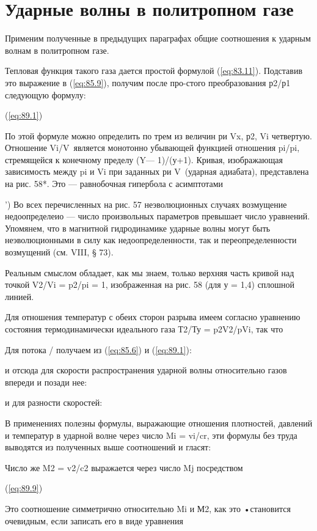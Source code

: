 \section{Ударные волны в политропном газе}\label{sec:p89}


Применим полученные в предыдущих параграфах общие соотношения к ударным волнам
в политропном газе.

Тепловая функция такого газа дается простой формулой (\ref{eq:83.11}). Подставив это
выражение в (\ref{eq:85.9}), получим после про-стого преобразования р2/р1 следующую
формулу:

(\ref{eq:89.1})

По этой формуле можно определить по трем из величин ри Vx, р2, Vi четвертую.
Отношение Vi/V\ является монотонно убывающей функцией отношения pi/pi,
стремящейся к конечному пределу (Y— 1)/(у+1). Кривая, изображающая зависимость
между pi и Vi при заданных ри V\ (ударная адиабата), представлена на рис. 58*.
Это — равнобочная гипербола с асимптотами


') Во всех перечисленных на рис. 57 неэволюционных случаях возмущение
недоопределеио — число произвольных параметров превышает число уравнений.
Упомянем, что в магнитной гидродинамике ударные волны могут быть
неэволюционными в силу как недоопределенности, так и переопределенности
возмущений (см. VIII, § 73).


Реальным смыслом обладает, как мы знаем, только верхняя часть кривой над точкой
V2/Vi = p2/pi = 1, изображенная на рис. 58 (для у = 1,4) сплошной линией.

Для отношения температур с обеих сторон разрыва имеем согласно уравнению
состояния термодинамически идеального газа Т2/Ту = p2V2/pVi, так что

Для потока / получаем из (\ref{eq:85.6}) и (\ref{eq:89.1}):


и отсюда для скорости распространения ударной волны относительно газов впереди
и позади нее:


и для разности скоростей:


В применениях полезны формулы, выражающие отношения плотностей, давлений и
температур в ударной волне через число Mi = vi/cr, эти формулы без труда
выводятся из полученных выше соотношений и гласят:


Число же M2 = v2/c2 выражается через число Mj	посредством


(\ref{eq:89.9})

Это соотношение симметрично относительно Mi и М2, как это •становится
очевидным, если записать его в виде уравнения



